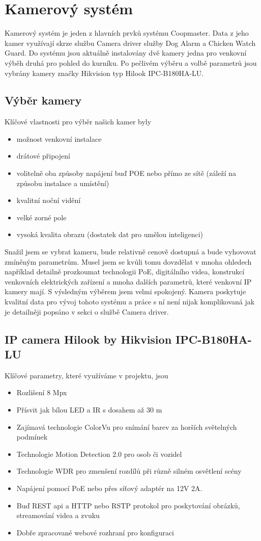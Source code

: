 \section{Kamerový systém}\label{sec:kamerovy-system}
Kamerový systém je jeden z hlavních prvků systému Coopmaster.
Data z jeho kamer využívají skrze službu Camera driver služby Dog Alarm a Chicken Watch Guard.
Do systému jsou aktuálně instalovány dvě kamery jedna pro venkovní výběh druhá pro pohled do kurníku.
Po pečlivém výběru a volbě parametrů jsou vybrány kamery značky Hikvision typ Hilook IPC-B180HA-LU.

\subsection*{Výběr kamery}
Klíčové vlastnosti pro výběr našich kamer byly
\begin{itemize}
    \item možnost venkovní instalace
    \item drátové připojení
    \item volitelně oba způsoby napájení buď POE nebo přímo ze sítě (záleží na způsobu instalace a umístění)
    \item kvalitní noční vidění
    \item velké zorné pole
    \item vysoká kvalita obrazu (dostatek dat pro umělou inteligenci)
\end{itemize}
Snažil jsem se vybrat kameru, bude relativně cenově dostupná a bude vyhovovat zmíněným parametrům.
Musel jsem se kvůli tomu dovzdělat v mnoha ohledech například detailně prozkoumat technologii PoE, digitálního videa, konstrukcí venkovních elektrických zařízení a mnoha dalších parametrů, které venkovní IP kamery mají.
S výsledným výběrem jsem velmi spokojený.
Kamera poskytuje kvalitní data pro vývoj tohoto systému a práce s ní není nijak komplikovaná jak je detailněji popsáno v sekci o službě Camera driver.

\subsection*{IP camera Hilook by Hikvision IPC-B180HA-LU}
Klíčové parametry, které využíváme v projektu, jsou
\begin{itemize}
    \item Rozlišení 8 Mpx
    \item Přísvit jak bílou LED a IR s dosahem až 30 m
    \item Zajímavá technologie ColorVu pro snímání barev za horších světelných podmínek
    \item Technologie Motion Detection 2.0 pro osob či vozidel
    \item Technologie WDR pro zmenšení rozdílů při různě silném osvětlení scény
    \item Napájení pomocí PoE nebo přes síťový adaptér na 12V 2A.
    \item Buď REST api a HTTP nebo RSTP protokol pro poskytování obrázků, streamování videa a zvuku
    \item Dobře zpracované webové rozhraní pro konfiguraci
\end{itemize}

%
%
%
